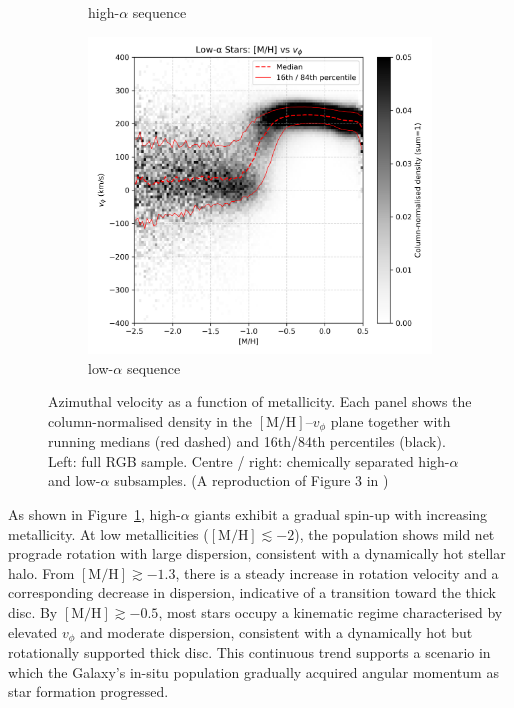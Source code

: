 \documentclass[a4paper,12pt]{article}
\begin{document}
\begin{figure}
\begin{subfigure}[b]{0.32\textwidth}
    \caption{high-$\alpha$ sequence}
  \end{subfigure}\hfill
  \begin{subfigure}[b]{0.32\textwidth}
    \includegraphics[width=\textwidth]{../figures/vis_mh_vphi_low_alpha.png}
    \caption{low-$\alpha$ sequence}
  \end{subfigure}

  \caption{Azimuthal velocity as a function of metallicity. 
           Each panel shows the column-normalised density in the
           $[\mathrm{M/H}]$–$v_\phi$ plane together with running medians
           (red dashed) and 16th/84th percentiles (black).  
           Left: full RGB sample.  Centre / right: chemically separated
           high-$\alpha$ and low-$\alpha$ subsamples. (A reproduction of Figure 3 in \citet{Vis2024}) }
  \label{fig:mh_vphi_alpha}
\end{figure}

 

As shown in Figure~\ref{fig:mh_vphi_alpha}, high-$\alpha$ giants 
exhibit a gradual spin-up with increasing metallicity.  
At low metallicities ($[\mathrm{M/H}]\lesssim -2$), the population 
shows mild net prograde rotation with large dispersion, 
consistent with a dynamically hot stellar halo. From $[\mathrm{M/H}]\gtrsim -1.3$, 
there is a steady increase in rotation velocity and a corresponding decrease in 
dispersion, indicative of a transition toward the thick disc.  
By $[\mathrm{M/H}]\gtrsim -0.5$, most stars occupy a kinematic regime characterised 
by elevated $v_\phi$ and moderate dispersion, consistent with a dynamically hot 
but rotationally supported thick disc. This continuous trend supports 
a scenario in which the Galaxy’s in-situ population gradually acquired angular 
momentum as star formation progressed.
\end{document}
